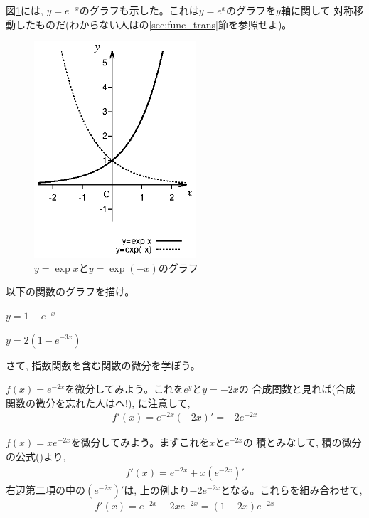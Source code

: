 図\ref{fig:y_expx}には, $y=e^{-x}$のグラフも示した。これは$y=e^x$のグラフを$y$軸に関して
対称移動したものだ(わからない人はの\ref{sec:func_trans}節を参照せよ)。\\
\begin{figure}[h]
    \centering
    \includegraphics[width=6.0cm]{exp.eps}
    \caption{$y=\exp x$と$y=\exp(-x)$のグラフ}\label{fig:y_expx}
\end{figure}

\begin{q}\label{q:exp_graph1} 以下の関数のグラフを描け。
\begin{edaenumerate}
\item $y=1-e^{-x}$
\item $y=2(1-e^{-3x})$
\end{edaenumerate}\end{q}
\mv

さて, 指数関数を含む関数の微分を学ぼう。

\begin{exmpl} $f(x)=e^{-2x}$を微分してみよう。これを$e^y$と$y=-2x$の
合成関数と見れば(合成関数の微分を忘れた人はへ!), 
に注意して, 
\begin{eqnarray}f'(x)=e^{-2x}(-2x)'=-2e^{-2x}\end{eqnarray}
\end{exmpl}

\begin{exmpl} $f(x)=xe^{-2x}$を微分してみよう。まずこれを$x$と$e^{-2x}$の
積とみなして, 積の微分の公式()より, 
\begin{eqnarray}f'(x)=e^{-2x}+x(e^{-2x})'\end{eqnarray}
右辺第二項の中の$(e^{-2x})'$は, 上の例より$-2e^{-2x}$となる。これらを組み合わせて, 
\begin{eqnarray}f'(x)=e^{-2x}-2xe^{-2x}=(1-2x)e^{-2x}\end{eqnarray}
\end{exmpl}

